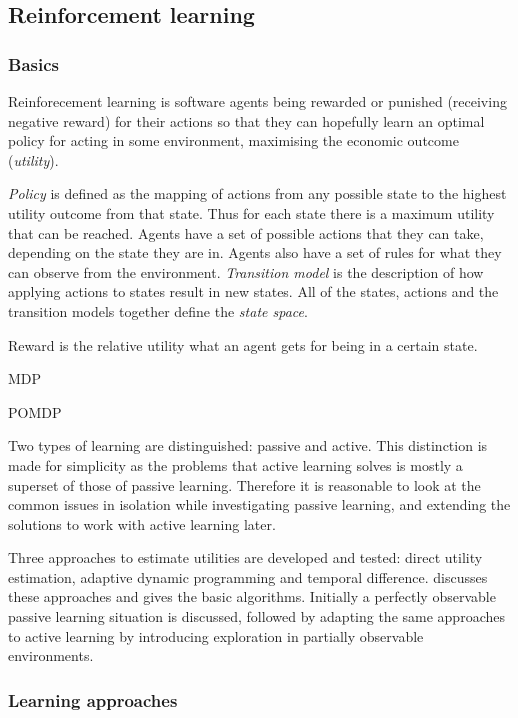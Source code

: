 \subsection{Reinforcement learning}
\label{sec:ai}

\subsubsection{Basics}

Reinforecement learning is software agents being rewarded or punished
(receiving negative reward) for their actions so that they can hopefully learn
an optimal policy for acting in some environment, maximising the economic
outcome (\textit{utility}).

\textit{Policy} is defined as the mapping of actions from any possible state to
the highest utility outcome from that state. Thus for each state there is a
maximum utility that can be reached. Agents have a set of possible actions that
they can take, depending on the state they are in. Agents also have a set of
rules for what they can observe from the environment. \textit{Transition model}
is the description of how applying actions to states result in new states. All
of the states, actions and the transition models together define the
\textit{state space}. \parencite{Russell2010ai+modern}

Reward is the relative utility what an agent gets for being in a certain state.


MDP

POMDP

Two types of learning are distinguished: passive and active. This distinction
is made for simplicity as the problems that active learning solves is mostly a
superset of those of passive learning. Therefore it is reasonable to look at
the common issues in isolation while investigating passive learning, and
extending the solutions to work with active learning later.

Three approaches to estimate utilities are developed and tested: direct utility
estimation, adaptive dynamic programming and temporal difference.
\parencite{Russell2010ai+modern} discusses these approaches and gives the basic
algorithms. Initially a perfectly observable passive learning situation is
discussed, followed by adapting the same approaches to active learning by
introducing exploration in partially observable environments.

\subsubsection{Learning approaches}

